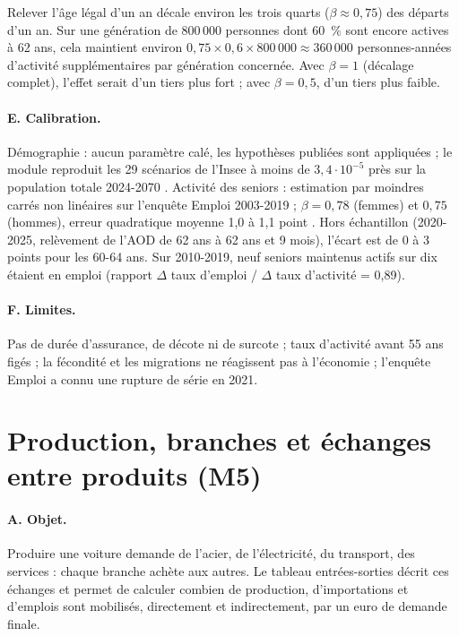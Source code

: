 \begin{exemple}
Relever l'âge légal d'un an décale environ les trois quarts ($\beta \approx 0{,}75$) des départs d'un an. Sur une
génération de 800\,000 personnes dont 60~\% sont encore actives à 62 ans, cela maintient environ
$0{,}75 \times 0{,}6 \times 800\,000 \approx 360\,000$ personnes-années d'activité supplémentaires par génération concernée.
Avec $\beta = 1$ (décalage complet), l'effet serait d'un tiers plus fort ; avec $\beta = 0{,}5$, d'un tiers plus faible.
\end{exemple}

\paragraph{E. Calibration.} Démographie : aucun paramètre calé, les hypothèses publiées sont appliquées ; le module
reproduit les 29 scénarios de l'Insee à moins de $3{,}4\cdot10^{-5}$ près sur la population totale 2024-2070
. Activité des seniors : estimation par moindres carrés non linéaires sur l'enquête Emploi 2003-2019 ;
$\beta = 0{,}78$ (femmes) et $0{,}75$ (hommes), erreur quadratique moyenne 1,0 à 1,1 point . Hors
échantillon (2020-2025, relèvement de l'AOD de 62 ans à 62 ans et 9 mois), l'écart est de 0 à 3 points pour les
60-64 ans. Sur 2010-2019, neuf seniors maintenus actifs sur dix étaient en emploi (rapport $\Delta$ taux
d'emploi / $\Delta$ taux d'activité = 0,89).

\paragraph{F. Limites.} Pas de durée d'assurance, de décote ni de surcote ; taux d'activité avant 55 ans figés ; la
fécondité et les migrations ne réagissent pas à l'économie ; l'enquête Emploi a connu une rupture de série en 2021.

\section{Production, branches et échanges entre produits (M5)}
\label{sec:m5}

\paragraph{A. Objet.} Produire une voiture demande de l'acier, de l'électricité, du transport, des services : chaque
branche achète aux autres. Le tableau entrées-sorties décrit ces échanges et permet de calculer combien de production,
d'importations et d'emplois sont mobilisés, directement et indirectement, par un euro de demande finale.

